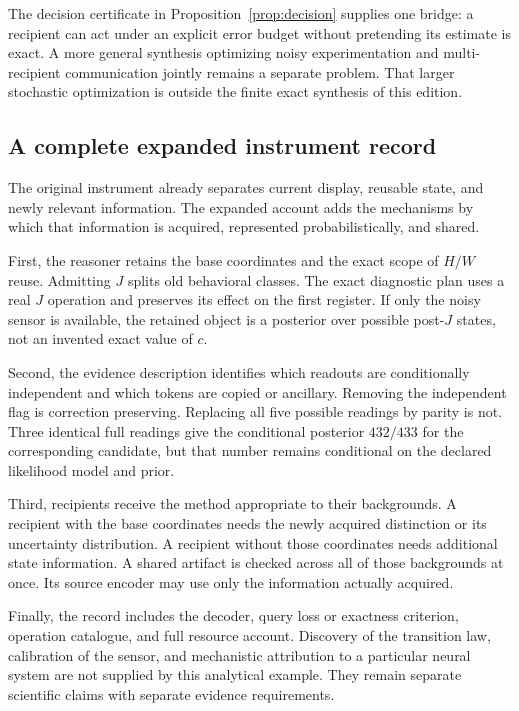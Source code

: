 \documentclass[11pt,letterpaper]{article}
\theoremstyle{plain}
\theoremstyle{definition}
\begin{document}
The decision certificate in Proposition~\ref{prop:decision} supplies one bridge: a recipient can act under an explicit error budget without pretending its estimate is exact. A more general synthesis optimizing noisy experimentation and multi-recipient communication jointly remains a separate problem. That larger stochastic optimization is outside the finite exact synthesis of this edition.

\subsection{A complete expanded instrument record}
The original instrument already separates current display, reusable state, and newly relevant information. The expanded account adds the mechanisms by which that information is acquired, represented probabilistically, and shared.

First, the reasoner retains the base coordinates and the exact scope of $H/W$ reuse. Admitting $J$ splits old behavioral classes. The exact diagnostic plan uses a real $J$ operation and preserves its effect on the first register. If only the noisy sensor is available, the retained object is a posterior over possible post-$J$ states, not an invented exact value of $c$.

Second, the evidence description identifies which readouts are conditionally independent and which tokens are copied or ancillary. Removing the independent flag is correction preserving. Replacing all five possible readings by parity is not. Three identical full readings give the conditional posterior $432/433$ for the corresponding candidate, but that number remains conditional on the declared likelihood model and prior.

Third, recipients receive the method appropriate to their backgrounds. A recipient with the base coordinates needs the newly acquired distinction or its uncertainty distribution. A recipient without those coordinates needs additional state information. A shared artifact is checked across all of those backgrounds at once. Its source encoder may use only the information actually acquired.

Finally, the record includes the decoder, query loss or exactness criterion, operation catalogue, and full resource account. Discovery of the transition law, calibration of the sensor, and mechanistic attribution to a particular neural system are not supplied by this analytical example. They remain separate scientific claims with separate evidence requirements.
\end{document}
